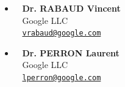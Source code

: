 \documentclass{resume}
\begin{document}
\begin{itemize}
\item \faGraduationCap~ \textbf{Dr. RABAUD Vincent}\\
\faBriefcase~ Google LLC \\
\faEnvelope~ \href{mailto:vrabaud@google.com}{\texttt{vrabaud@google.com}}\\

\item \faGraduationCap~ \textbf{Dr. PERRON Laurent}\\
\faBriefcase~ Google LLC \\
\faEnvelope~ \href{mailto:lperron@google.com}{\texttt{lperron@google.com}}\\
\end{itemize}
\end{document}

